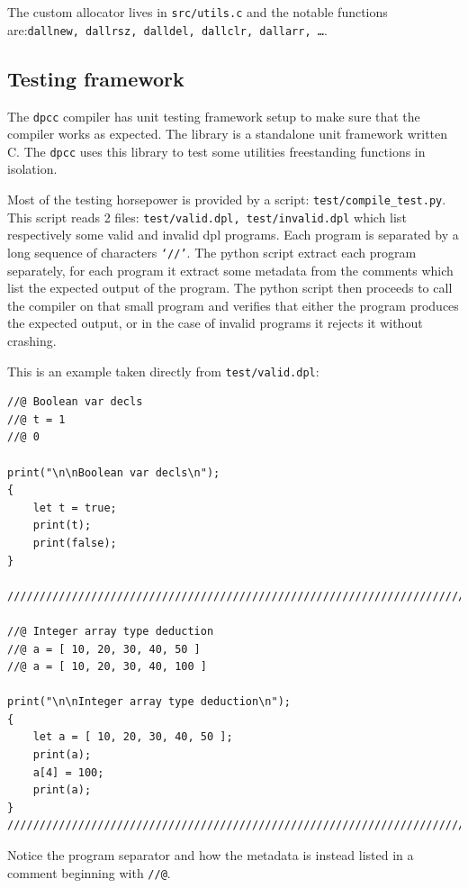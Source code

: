 \documentclass[a4paper]{article}
\newcommand{\urlref}[3][blue]{\href{#2}{\color{#1}{#3}}}%
\begin{document}
The custom allocator lives in \texttt{src/utils.c} and the notable functions are:\texttt{dallnew, dallrsz, dalldel, dallclr, dallarr, \dots}.


\subsection{Testing framework}

The \texttt{dpcc} compiler has unit testing framework setup to make sure that the compiler works as expected.
The library \urlref{https://github.com/ThrowTheSwitch/Unity}{Unity} is a standalone unit framework written C. The
\texttt{dpcc} uses this library to test some utilities freestanding functions in isolation.

Most of the testing horsepower is provided by a \urlref{https://www.python.org/}{Python} script: \texttt{test/compile\_test.py}.
This script reads 2 files: \texttt{test/valid.dpl, test/invalid.dpl} which list respectively some valid and invalid dpl programs.
Each program is separated by a long sequence of characters \texttt{`//'}. The python script extract each program
separately, for each program it extract some metadata from the comments which list the expected output of the program.
The python script then proceeds to call the compiler on that small program and verifies that either the program
produces the expected output, or in the case of invalid programs it rejects it without crashing.


This is an example taken directly from \texttt{test/valid.dpl}:

\begin{lstlisting}[language=DPL]
//@ Boolean var decls
//@ t = 1
//@ 0

print("\n\nBoolean var decls\n");
{
    let t = true;
    print(t);
    print(false);
}

///////////////////////////////////////////////////////////////////////////////

//@ Integer array type deduction
//@ a = [ 10, 20, 30, 40, 50 ]
//@ a = [ 10, 20, 30, 40, 100 ]

print("\n\nInteger array type deduction\n");
{
    let a = [ 10, 20, 30, 40, 50 ];
    print(a);
    a[4] = 100;
    print(a);
}
///////////////////////////////////////////////////////////////////////////////
\end{lstlisting}

Notice the program separator and how the metadata is instead listed in a comment beginning with \texttt{//@}.
\end{document}
